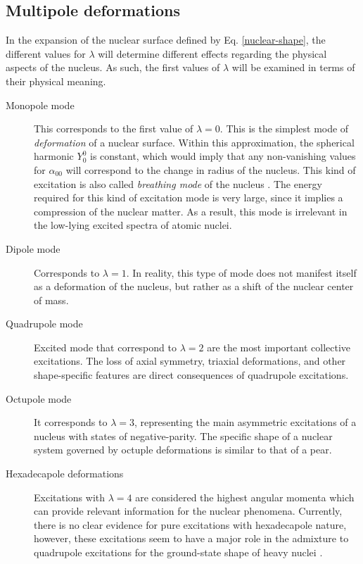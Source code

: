 \subsection{Multipole deformations}

In the expansion of the nuclear surface defined by Eq. 
\ref{nuclear-shape}, the different values for $\lambda$ will determine different effects regarding the physical aspects of the nucleus. As such, the first values of $\lambda$ will be examined in terms of their physical meaning.
\begin{description}
    \item[Monopole mode] This corresponds to the first value of $\lambda=0$. This is the simplest mode of \emph{deformation} of a nuclear surface. Within this approximation, the spherical harmonic $Y_0^0$ is constant, which would imply that any non-vanishing values for $\alpha_{00}$ will correspond to the change in radius of the nucleus. This kind of excitation is also called \emph{breathing mode} of the nucleus \cite{greiner1996nuclear,bohr1998nuclear}. The energy required for this kind of excitation mode is very large, since it implies a compression of the nuclear matter. As a result, this mode is irrelevant in the low-lying excited spectra of atomic nuclei.
    \item[Dipole mode] Corresponds to $\lambda=1$. In reality, this type of mode does not manifest itself as a deformation of the nucleus, but rather as a shift of the nuclear center of mass.
    \item[Quadrupole mode] Excited mode that correspond to $\lambda=2$ are the most important collective excitations. The loss of axial symmetry, triaxial deformations, and other shape-specific features are direct consequences of quadrupole excitations.
    \item[Octupole mode] It corresponds to $\lambda=3$, representing the main asymmetric excitations of a nucleus with states of negative-parity. The specific shape of a nuclear system governed by octuple deformations is similar to that of a pear.
    \item[Hexadecapole deformations] Excitations with $\lambda=4$ are considered the highest angular momenta which can provide relevant information for the nuclear phenomena. Currently, there is no clear evidence for pure excitations with hexadecapole nature, however, these excitations seem to have a major role in the admixture to quadrupole excitations for the ground-state shape of heavy nuclei \cite{greiner1996nuclear}.
\end{description}

